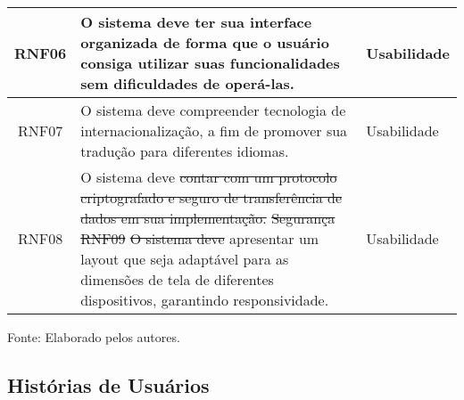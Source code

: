 \documentclass[
    12pt,               %
    openright,          %
    oneside,
    a4paper,            %
    BIBLATEX,           %
    TODO,               %
    english,            %
    brazil              %
    ]{ifsp-spo-inf-ctds}
\providecommand{\DIFdel}[1]{{\protect\color{red}\sout{#1}}}                      %
\providecommand{\DIFdelbegin}{} %
\providecommand{\DIFdelend}{} %
\newcommand{\DIFscaledelfig}{0.5}
\newlength{\DIFdelgraphicswidth} %
\newlength{\DIFdelgraphicsheight} %
\newcommand{\DIFdelincludegraphics}[2][]{%
\sbox{\DIFdelgraphicsbox}{\DIFOincludegraphics[#1]{#2}}%
\settoboxwidth{\DIFdelgraphicswidth}{\DIFdelgraphicsbox} %
\settoboxtotalheight{\DIFdelgraphicsheight}{\DIFdelgraphicsbox} %
\scalebox{\DIFscaledelfig}{%
\parbox[b]{\DIFdelgraphicswidth}{\usebox{\DIFdelgraphicsbox}\\[-\baselineskip] \rule{\DIFdelgraphicswidth}{0em}}\llap{\resizebox{\DIFdelgraphicswidth}{\DIFdelgraphicsheight}{%
\setlength{\unitlength}{\DIFdelgraphicswidth}%
\begin{picture}(1,1)%
\thicklines\linethickness{2pt} %
{\color[rgb]{1,0,0}\put(0,0){\framebox(1,1){}}}%
{\color[rgb]{1,0,0}\put(0,0){\line( 1,1){1}}}%
{\color[rgb]{1,0,0}\put(0,1){\line(1,-1){1}}}%
\end{picture}%
}\hspace*{3pt}}} %
} %
\DeclareRobustCommand{\DIFdelbegin}{\DIFOdelbegin \let\includegraphics\DIFdelincludegraphics} %
\DeclareRobustCommand{\DIFdelend}{\DIFOaddend \let\includegraphics\DIFOincludegraphics} %
\begin{document}
\begin{center}
\begin{quadro}[h]
\begin{tabulary}{1.0\textwidth}{|C|p{25em}|p{7em}|}
                \hline
                RNF06 & O sistema deve ter sua interface organizada de forma que o usuário consiga utilizar suas funcionalidades sem dificuldades de operá-las. & Usabilidade\\
                \hline
                RNF07 & O sistema deve compreender tecnologia de internacionalização, a fim de promover sua tradução para diferentes idiomas. & Usabilidade\\
                \hline
                RNF08 & O sistema deve \DIFdelbegin \DIFdel{contar com um protocolo criptografado e seguro de transferência de dados em sua implementação. }%
\DIFdel{Segurança}%
\DIFdel{RNF09 }%
\DIFdel{O sistema deve }\DIFdelend apresentar um layout que seja adaptável para as dimensões de tela de diferentes dispositivos, garantindo responsividade. & Usabilidade\\
                \hline
                \end{tabulary}
                \label{tab:req_nfunc}
                \centering

               \footnotesize Fonte: Elaborado pelos autores.
                \end{quadro}
            \end{center}

\subsection{Histórias de Usuários}
\end{document}
